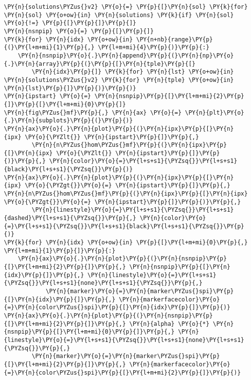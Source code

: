 \begin{Verbatim}[commandchars=\\\{\}]
\PY{n}{solutions\PYZus{}v2} \PY{o}{=} \PY{p}{[}\PY{n}{sol} \PY{k}{for} \PY{n}{sol} \PY{o+ow}{in} \PY{n}{solutions} \PY{k}{if} \PY{n}{sol} \PY{o}{!=} \PY{p}{[}\PY{p}{]}\PY{p}{]}
\PY{n}{nsnpip} \PY{o}{=} \PY{p}{[}\PY{p}{]}
\PY{k}{for} \PY{n}{idx} \PY{o+ow}{in} \PY{n+nb}{range}\PY{p}{(}\PY{l+m+mi}{1}\PY{p}{,} \PY{l+m+mi}{4}\PY{p}{)}\PY{p}{:}
    \PY{n}{nsnpip}\PY{o}{.}\PY{n}{append}\PY{p}{(}\PY{n}{np}\PY{o}{.}\PY{n}{array}\PY{p}{(}\PY{p}{[}\PY{n}{tple}\PY{p}{[}
        \PY{n}{idx}\PY{p}{]} \PY{k}{for} \PY{n}{lst} \PY{o+ow}{in} \PY{n}{solutions\PYZus{}v2} \PY{k}{for} \PY{n}{tple} \PY{o+ow}{in} \PY{n}{lst}\PY{p}{]}\PY{p}{)}\PY{p}{)}
\PY{n}{ipstart} \PY{o}{=} \PY{n}{nsnpip}\PY{p}{[}\PY{l+m+mi}{2}\PY{p}{]}\PY{p}{[}\PY{l+m+mi}{0}\PY{p}{]}
\PY{n}{fig\PYZus{}mf}\PY{p}{,} \PY{n}{ax} \PY{o}{=} \PY{n}{plt}\PY{o}{.}\PY{n}{subplots}\PY{p}{(}\PY{p}{)}
\PY{n}{ax}\PY{o}{.}\PY{n}{plot}\PY{p}{(}\PY{n}{ipx}\PY{p}{[}\PY{n}{ipx} \PY{o}{\PYZlt{}} \PY{n}{ipstart}\PY{p}{]}\PY{p}{,}
        \PY{n}{n\PYZus{}hom\PYZus{}mf}\PY{p}{(}\PY{n}{ipx}\PY{p}{[}\PY{n}{ipx} \PY{o}{\PYZlt{}} \PY{n}{ipstart}\PY{p}{]}\PY{p}{)}\PY{p}{,} \PY{n}{color}\PY{o}{=}\PY{l+s+s1}{\PYZsq{}}\PY{l+s+s1}{black}\PY{l+s+s1}{\PYZsq{}}\PY{p}{)}
\PY{n}{ax}\PY{o}{.}\PY{n}{plot}\PY{p}{(}\PY{n}{ipx}\PY{p}{[}\PY{n}{ipx} \PY{o}{\PYZgt{}}\PY{o}{=} \PY{n}{ipstart}\PY{p}{]}\PY{p}{,} \PY{n}{n\PYZus{}hom\PYZus{}mf}\PY{p}{(}\PY{n}{ipx}\PY{p}{[}\PY{n}{ipx} \PY{o}{\PYZgt{}}\PY{o}{=} \PY{n}{ipstart}\PY{p}{]}\PY{p}{)}\PY{p}{,}
        \PY{n}{linestyle}\PY{o}{=}\PY{l+s+s1}{\PYZsq{}}\PY{l+s+s1}{dashed}\PY{l+s+s1}{\PYZsq{}}\PY{p}{,} \PY{n}{color}\PY{o}{=}\PY{l+s+s1}{\PYZsq{}}\PY{l+s+s1}{black}\PY{l+s+s1}{\PYZsq{}}\PY{p}{)}
\PY{k}{for} \PY{n}{idx} \PY{o+ow}{in} \PY{p}{[}\PY{l+m+mi}{0}\PY{p}{,} \PY{l+m+mi}{1}\PY{p}{]}\PY{p}{:}
    \PY{n}{ax}\PY{o}{.}\PY{n}{plot}\PY{p}{(}\PY{n}{nsnpip}\PY{p}{[}\PY{l+m+mi}{2}\PY{p}{]}\PY{p}{,} \PY{n}{nsnpip}\PY{p}{[}\PY{n}{idx}\PY{p}{]}\PY{p}{,} \PY{n}{linestyle}\PY{o}{=}\PY{l+s+s1}{\PYZsq{}}\PY{l+s+s1}{none}\PY{l+s+s1}{\PYZsq{}}\PY{p}{,}
            \PY{n}{marker}\PY{o}{=}\PY{n}{marker\PYZus{}spi}\PY{p}{[}\PY{n}{idx}\PY{p}{]}\PY{p}{,} \PY{n}{markerfacecolor}\PY{o}{=}\PY{n}{color\PYZus{}spi}\PY{p}{[}\PY{n}{idx}\PY{p}{]}\PY{p}{)}
\PY{n}{ax}\PY{o}{.}\PY{n}{plot}\PY{p}{(}\PY{n}{nsnpip}\PY{p}{[}\PY{l+m+mi}{2}\PY{p}{]}\PY{p}{,} \PY{n}{alpha} \PY{o}{*} \PY{n}{nsnpip}\PY{p}{[}\PY{l+m+mi}{0}\PY{p}{]}\PY{p}{,} \PY{n}{linestyle}\PY{o}{=}\PY{l+s+s1}{\PYZsq{}}\PY{l+s+s1}{none}\PY{l+s+s1}{\PYZsq{}}\PY{p}{,}
        \PY{n}{marker}\PY{o}{=}\PY{n}{marker\PYZus{}spi}\PY{p}{[}\PY{l+m+mi}{2}\PY{p}{]}\PY{p}{,} \PY{n}{markerfacecolor}\PY{o}{=}\PY{n}{color\PYZus{}spi}\PY{p}{[}\PY{l+m+mi}{2}\PY{p}{]}\PY{p}{)}

\end{Verbatim}

